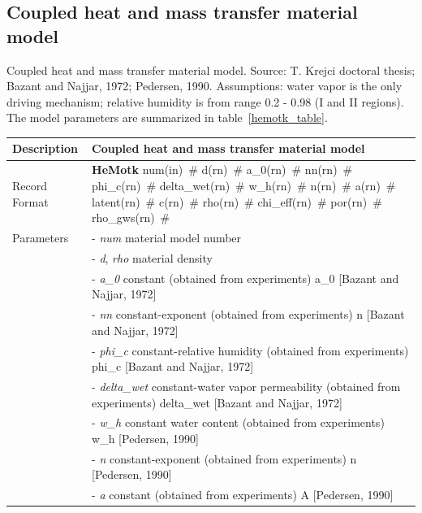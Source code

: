 \documentclass[epsf,a4paper]{article}
\newcommand{\descitem}[1]{{\noindent \bf #1}}
\newcommand{\elemparam}[2]{{{#1\tiny (#2)}~\#}}
\newcommand{\param}[1]{{\it #1}}
\begin{document}
\subsection{Coupled heat and mass transfer material model}
Coupled heat and mass transfer material model. 
Source: T. Krejci doctoral thesis; Bazant and Najjar, 1972;
Pedersen, 1990. Assumptions:      water vapor is the only driving
mechanism; relative humidity is from range 0.2 - 0.98 (I and II
regions).
The model parameters are summarized
in table~\ref{hemotk_table}.
\begin{table}[h]                                                                
\begin{tabular}{|l|p{9cm}|}                                                      
\hline                                                                          
Description & Coupled heat and mass transfer material model\\
\hline                                                                          
Record Format & \descitem{HeMotk} \elemparam{num}{in}
\elemparam{d}{rn} \elemparam{a\_0}{rn} \elemparam{nn}{rn}
\elemparam{phi\_c}{rn} \elemparam{delta\_wet}{rn}
\elemparam{w\_h}{rn} \elemparam{n}{rn}
\elemparam{a}{rn} \elemparam{latent}{rn}
\elemparam{c}{rn} \elemparam{rho}{rn}
\elemparam{chi\_eff}{rn} \elemparam{por}{rn}
\elemparam{rho\_gws}{rn}\\
Parameters &- \param{num} material model number\\
&- \param{d}, \param{rho} material density\\
&- \param{a\_0} constant (obtained from experiments) a\_0 [Bazant and Najjar, 1972]\\
&- \param{nn} constant-exponent (obtained from experiments) n [Bazant
and Najjar, 1972]\\
&- \param{phi\_c} constant-relative humidity  (obtained from experiments) phi\_c [Bazant and Najjar, 1972]\\
&- \param{delta\_wet} constant-water vapor permeability (obtained from
experiments) delta\_wet [Bazant and Najjar, 1972]\\
&- \param{w\_h} constant water content (obtained from experiments) w\_h
[Pedersen, 1990]\\
&- \param{n} constant-exponent (obtained from experiments) n [Pedersen, 1990]\\
&- \param{a} constant (obtained from experiments) A [Pedersen, 1990]\\

\end{tabular}
\end{table}
\end{document}
